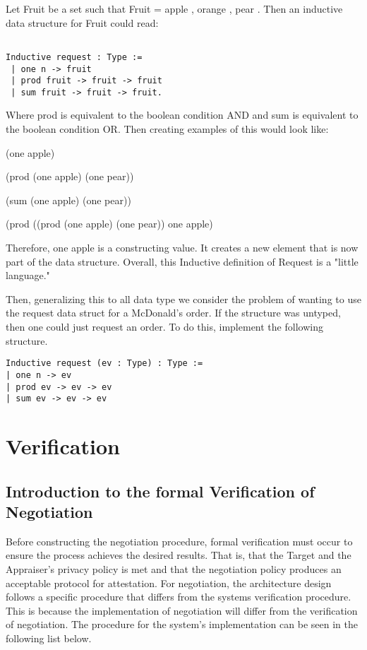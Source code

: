\documentclass[10pt]{report}
\begin{document}
Let Fruit be a set such that Fruit = { apple , orange , pear }. Then an
inductive data structure for Fruit could read:  

\begin{verbatim}

Inductive request : Type := 
 | one n -> fruit
 | prod fruit -> fruit -> fruit
 | sum fruit -> fruit -> fruit.
\end{verbatim}

Where prod is equivalent to the boolean condition AND and sum is equivalent
to the boolean condition OR. Then creating examples of this would look like: 


(one apple)

(prod (one apple) (one pear))

(sum (one apple) (one pear))

(prod ((prod (one apple) (one pear)) one apple)


Therefore, one apple is a constructing value. It creates a new element that is
now part of the data structure. Overall, this Inductive definition of Request
is a "little language."

Then, generalizing this to all data type we consider the problem of wanting
to use the request data struct for a McDonald's order. If the structure was
untyped, then one could just request an order. To do this, implement the
following structure. 

\begin{verbatim}
Inductive request (ev : Type) : Type :=
| one n -> ev
| prod ev -> ev -> ev
| sum ev -> ev -> ev

\end{verbatim}


\chapter {Verification}

\section {Introduction to the formal Verification of Negotiation}

Before constructing the negotiation procedure, formal verification must occur
to ensure the process achieves the desired results. That is, that the Target
and the Appraiser's privacy policy is met and that the negotiation policy
produces an acceptable protocol for attestation. For negotiation, the architecture
design follows a specific procedure that differs from the systems verification
procedure. This is because the implementation of negotiation will differ from the
verification of negotiation. The procedure for the system's implementation can
be seen in the following list below. 
\end{document}
